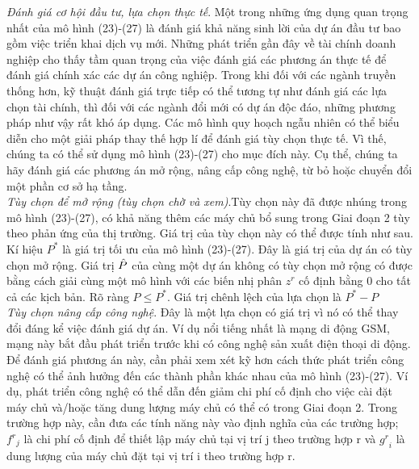 \documentclass[a4paper]{article}
\begin{document}
\begin{itemize}
        \textit{Đánh giá cơ hội đầu tư, lựa chọn thực tế}. Một trong những ứng dụng quan trọng nhất của mô hình (23)-(27) là đánh giá khả năng sinh lời của dự án đầu tư bao gồm việc triển khai dịch vụ mới. 
        Những phát triển gần đây về tài chính doanh nghiệp cho thấy tầm quan trọng của việc đánh giá các phương án thực tế để đánh giá chính xác các dự án công nghiệp. 
        Trong khi đối với các ngành truyền thống hơn, kỹ thuật đánh giá trực tiếp có thể tương tự như đánh giá các lựa chọn tài chính, thì đối với các ngành đổi mới có dự án độc đáo, những phương pháp như vậy rất khó áp dụng.
        Các mô hình quy hoạch ngẫu nhiên có thể biểu diễn cho một giải pháp thay thế hợp lí để đánh giá tùy chọn thực tế. 
        Vì thế, chúng ta có thể sử dụng mô hình (23)-(27) cho mục đích này.
        Cụ thể, chúng ta hãy đánh giá các phương án mở rộng, nâng cấp công nghệ, từ bỏ hoặc chuyển đổi một phần cơ sở hạ tầng.
        \\

        \textit{Tùy chọn để mở rộng (tùy chọn chờ và xem)}.Tùy chọn này đã được nhúng trong mô hình (23)-(27), có khả năng thêm các máy chủ bổ sung trong Giai đoạn 2 tùy theo phản ứng của thị trường. 
        Giá trị của tùy chọn này có thể được tính như sau. 
        Kí hiệu $P^*$ là giá trị tối ưu của mô hình (23)-(27).
        Đây là giá trị của dự án có tùy chọn mở rộng.
        Giá trị $\Hat{P}$ của cùng một dự án không có tùy chọn mở rộng có được bằng cách giải cùng một mô hình với các biến nhị phân $z^r$ cố định bằng 0 cho tất cả các kịch bản.
        Rõ ràng $P \leq P^*$. Giá trị chênh lệch của lựa chọn là $P^* - P$
        \\

        \textit{Tùy chọn nâng cấp công nghệ}. Đây là một lựa chọn có giá trị vì nó có thể thay đổi đáng kể việc đánh giá dự án. 
        Ví dụ nổi tiếng nhất là mạng di động GSM, mạng này bắt đầu phát triển trước khi có công nghệ sản xuất điện thoại di động.
        Để đánh giá phương án này, cần phải xem xét kỹ hơn cách thức phát triển công nghệ có thể ảnh hưởng đến các thành phần khác nhau của mô hình (23)-(27).
        Ví dụ, phát triển công nghệ có thể dẫn đến giảm chi phí cố định cho việc cài đặt máy chủ và/hoặc tăng dung lượng máy chủ có thể có trong Giai đoạn 2. 
        Trong trường hợp này, cần đưa các tính năng này vào định nghĩa của các trường hợp; 
        ${f^r}_j$ là chi phí cố định để thiết lập máy chủ tại vị trí j theo trường hợp r và 
        ${g^r}_i$ là dung lượng của máy chủ đặt tại vị trí i theo trường hợp r.


\end{itemize}
\end{document}
